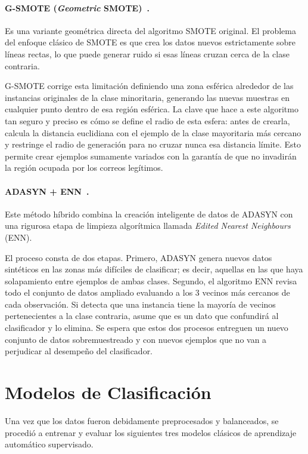 \documentclass[a4paper,11pt ,openany]{book}
\begin{document}
\paragraph{G-SMOTE (\textit{Geometric} SMOTE)~\cite{douzas2019gsmote}.}{
Es una variante geométrica directa del algoritmo SMOTE original. El problema del enfoque clásico de SMOTE es que crea los datos nuevos estrictamente sobre líneas rectas, lo que puede generar ruido si esas líneas cruzan cerca de la clase contraria. 

G-SMOTE corrige esta limitación definiendo una zona esférica alrededor de las instancias originales de la clase minoritaria, generando las nuevas muestras en cualquier punto dentro de esa región esférica. La clave que hace a este algoritmo tan seguro y preciso es cómo se define el radio de esta esfera: antes de crearla, calcula la distancia euclidiana con el ejemplo de la clase mayoritaria más cercano y restringe el radio de generación para no cruzar nunca esa distancia límite. Esto permite crear ejemplos sumamente variados con la garantía de que no invadirán la región ocupada por los correos legítimos.}

\paragraph{ADASYN + ENN~\cite{batista2004study}.}{
Este método híbrido combina la creación inteligente de datos de ADASYN con una rigurosa etapa de limpieza algorítmica llamada \textit{Edited Nearest Neighbours} (ENN). 

El proceso consta de dos etapas. Primero, ADASYN genera nuevos datos sintéticos en las zonas más difíciles de clasificar; es decir, aquellas en las que haya solapamiento entre ejemplos de ambas clases. Segundo, el algoritmo ENN revisa todo el conjunto de datos ampliado evaluando a los 3 vecinos más cercanos de cada observación. Si detecta que una instancia tiene la mayoría de vecinos pertenecientes a la clase contraria, asume que es un dato que confundirá al clasificador y lo elimina. Se espera que estos dos procesos entreguen un nuevo conjunto de datos sobremuestreado y con nuevos ejemplos que no van a perjudicar al desempeño del clasificador.}


\section{Modelos de Clasificación}

Una vez que los datos fueron debidamente preprocesados y balanceados, se procedió a entrenar y evaluar los siguientes tres modelos clásicos de aprendizaje automático supervisado. 
\end{document}
